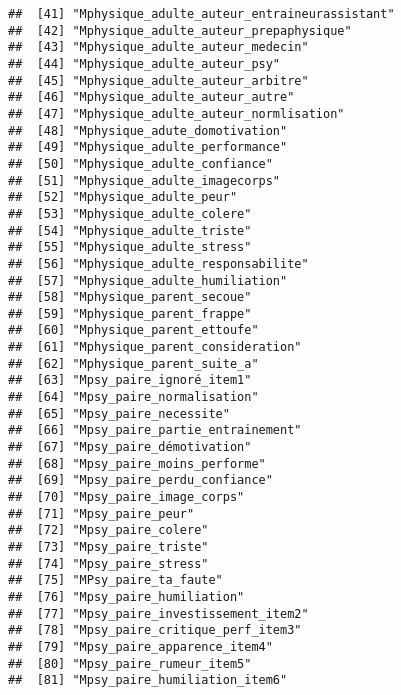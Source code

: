 \documentclass[
]{article}
\begin{document}
\begin{verbatim}
##  [41] "Mphysique_adulte_auteur_entraineurassistant"         
##  [42] "Mphysique_adulte_auteur_prepaphysique"               
##  [43] "Mphysique_adulte_auteur_medecin"                     
##  [44] "Mphysique_adulte_auteur_psy"                         
##  [45] "Mphysique_adulte_auteur_arbitre"                     
##  [46] "Mphysique_adulte_auteur_autre"                       
##  [47] "Mphysique_adulte_auteur_normlisation"                
##  [48] "Mphysique_adute_domotivation"                        
##  [49] "Mphysique_adulte_performance"                        
##  [50] "Mphysique_adulte_confiance"                          
##  [51] "Mphysique_adulte_imagecorps"                         
##  [52] "Mphysique_adulte_peur"                               
##  [53] "Mphysique_adulte_colere"                             
##  [54] "Mphysique_adulte_triste"                             
##  [55] "Mphysique_adulte_stress"                             
##  [56] "Mphysique_adulte_responsabilite"                     
##  [57] "Mphysique_adulte_humiliation"                        
##  [58] "Mphysique_parent_secoue"                             
##  [59] "Mphysique_parent_frappe"                             
##  [60] "Mphysique_parent_ettoufe"                            
##  [61] "Mphysique_parent_consideration"                      
##  [62] "Mphysique_parent_suite_a"                            
##  [63] "Mpsy_paire_ignoré_item1"                             
##  [64] "Mpsy_paire_normalisation"                            
##  [65] "Mpsy_paire_necessite"                                
##  [66] "Mpsy_paire_partie_entrainement"                      
##  [67] "Mpsy_paire_démotivation"                             
##  [68] "Mpsy_paire_moins_performe"                           
##  [69] "Mpsy_paire_perdu_confiance"                          
##  [70] "Mpsy_paire_image_corps"                              
##  [71] "Mpsy_paire_peur"                                     
##  [72] "Mpsy_paire_colere"                                   
##  [73] "Mpsy_paire_triste"                                   
##  [74] "Mpsy_paire_stress"                                   
##  [75] "MPsy_paire_ta_faute"                                 
##  [76] "Mpsy_paire_humiliation"                              
##  [77] "Mpsy_paire_investissement_item2"                     
##  [78] "Mpsy_paire_critique_perf_item3"                      
##  [79] "Mpsy_paire_apparence_item4"                          
##  [80] "Mpsy_paire_rumeur_item5"                             
##  [81] "Mpsy_paire_humiliation_item6"                        

\end{verbatim}
\end{document}
